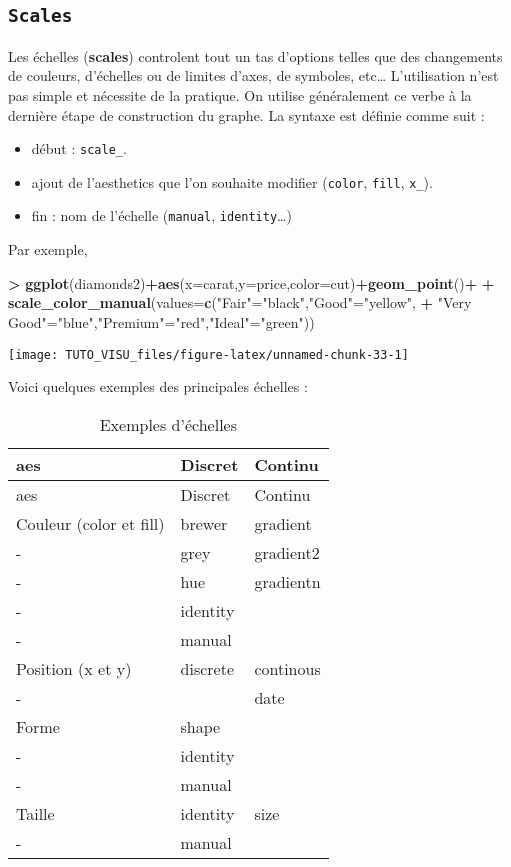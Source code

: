 \documentclass[]{book}
\newenvironment{Shaded}{\begin{snugshade}}{\end{snugshade}}
\newcommand{\DataTypeTok}[1]{\textcolor[rgb]{0.13,0.29,0.53}{#1}}
\newcommand{\KeywordTok}[1]{\textcolor[rgb]{0.13,0.29,0.53}{\textbf{#1}}}
\newcommand{\NormalTok}[1]{#1}
\newcommand{\OperatorTok}[1]{\textcolor[rgb]{0.81,0.36,0.00}{\textbf{#1}}}
\newcommand{\StringTok}[1]{\textcolor[rgb]{0.31,0.60,0.02}{#1}}
\providecommand{\tightlist}{%
  \setlength{\itemsep}{0pt}\setlength{\parskip}{0pt}}
\theoremstyle{definition}
\theoremstyle{definition}
\theoremstyle{definition}
\theoremstyle{remark}
\begin{document}
\hypertarget{scales}{%
\subsection{\texorpdfstring{\texttt{Scales}}{Scales}}\label{scales}}

Les échelles (\textbf{scales}) controlent tout un tas d'options telles que des changements de couleurs, d'échelles ou de limites d'axes, de symboles, etc\ldots{} L'utilisation n'est pas simple et nécessite de la pratique. On utilise généralement ce verbe à la dernière étape de construction du graphe. La syntaxe est définie comme suit :

\begin{itemize}
\tightlist
\item
  début : \texttt{scale\_}.
\item
  ajout de l'aesthetics que l'on souhaite modifier (\texttt{color}, \texttt{fill}, \texttt{x\_}).
\item
  fin : nom de l'échelle (\texttt{manual}, \texttt{identity}\ldots{})
\end{itemize}

Par exemple,

\begin{Shaded}
\begin{Highlighting}[]
\OperatorTok{>}\StringTok{ }\KeywordTok{ggplot}\NormalTok{(diamonds2)}\OperatorTok{+}\KeywordTok{aes}\NormalTok{(}\DataTypeTok{x=}\NormalTok{carat,}\DataTypeTok{y=}\NormalTok{price,}\DataTypeTok{color=}\NormalTok{cut)}\OperatorTok{+}\KeywordTok{geom_point}\NormalTok{()}\OperatorTok{+}
\OperatorTok{+}\StringTok{   }\KeywordTok{scale_color_manual}\NormalTok{(}\DataTypeTok{values=}\KeywordTok{c}\NormalTok{(}\StringTok{"Fair"}\NormalTok{=}\StringTok{"black"}\NormalTok{,}\StringTok{"Good"}\NormalTok{=}\StringTok{"yellow"}\NormalTok{,}
\OperatorTok{+}\StringTok{                               "Very Good"}\NormalTok{=}\StringTok{"blue"}\NormalTok{,}\StringTok{"Premium"}\NormalTok{=}\StringTok{"red"}\NormalTok{,}\StringTok{"Ideal"}\NormalTok{=}\StringTok{"green"}\NormalTok{))}
\end{Highlighting}
\end{Shaded}

\begin{center}\texttt{[image: TUTO\_VISU\_files/figure-latex/unnamed-chunk-33-1]} \end{center}

Voici quelques exemples des principales échelles :

\begin{longtable}[]{@{}lll@{}}
\caption{\label{tab:scales} Exemples d'échelles}\tabularnewline
\toprule
aes & Discret & Continu\tabularnewline
\midrule
\endfirsthead
\toprule
aes & Discret & Continu\tabularnewline
\midrule
\endhead
Couleur (color et fill) & brewer & gradient\tabularnewline
- & grey & gradient2\tabularnewline
- & hue & gradientn\tabularnewline
- & identity &\tabularnewline
- & manual &\tabularnewline
Position (x et y) & discrete & continous\tabularnewline
- & & date\tabularnewline
Forme & shape &\tabularnewline
- & identity &\tabularnewline
- & manual &\tabularnewline
Taille & identity & size\tabularnewline
- & manual &\tabularnewline
\bottomrule
\end{longtable}
\end{document}
